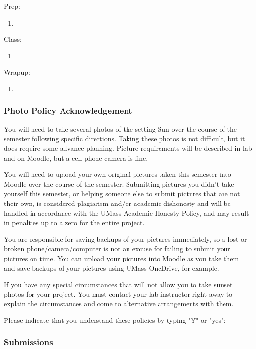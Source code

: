 \documentclass[12pt]{article}
\begin{document}
Prep:
\begin{enumerate}
\item
\end{enumerate}

\noindent
Class:
\begin{enumerate}
\item
\end{enumerate}

\noindent
Wrapup:
\begin{enumerate}
\item
\end{enumerate}


\subsubsection{Photo Policy Acknowledgement}

You will need to take several photos of the setting Sun over the course of the semester following specific directions. Taking these photos is not difficult, but it does require some advance planning. Picture requirements will be described in lab and on Moodle, but a cell phone camera is fine.

You will need to upload your own original pictures taken this semester into Moodle over the course of the semester. Submitting pictures you didn't take yourself this semester, or helping someone else to submit pictures that are not their own, is considered plagiarism and/or academic dishonesty and will be handled in accordance with the UMass Academic Honesty Policy, and may result in penalties up to a zero for the entire project.

You are responsible for saving backups of your pictures immediately, so a lost or broken phone/camera/computer is not an excuse for failing to submit your pictures on time. You can upload your pictures into Moodle as you take them and save backups of your pictures using UMass OneDrive, for example.

If you have any special circumstances that will not allow you to take sunset photos for your project. You must contact your lab instructor right away to explain the circumstances and come to alternative arrangements with them.

Please indicate that you understand these policies by typing "Y" or "yes":

\subsubsection{Submissions}
\end{document}
